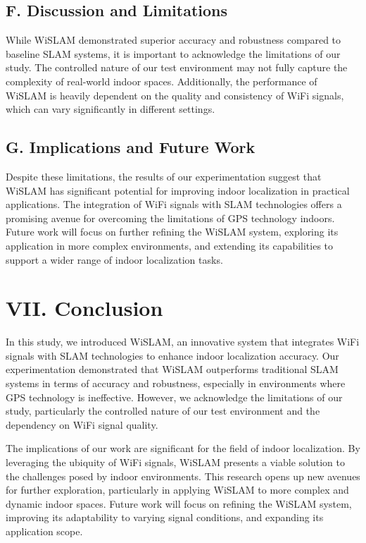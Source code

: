\documentclass[
	a4paper, %
	11pt, %
	unnumberedsections, %
	twoside, %
]{LTJournalArticle}
\begin{document}
\subsection{F.	Discussion and Limitations}
While WiSLAM demonstrated superior accuracy and robustness compared to baseline SLAM systems, it is important to acknowledge the limitations of our study. The controlled nature of our test environment may not fully capture the complexity of real-world indoor spaces. Additionally, the performance of WiSLAM is heavily dependent on the quality and consistency of WiFi signals, which can vary significantly in different settings.

\subsection{G.	Implications and Future Work}
Despite these limitations, the results of our experimentation suggest that WiSLAM has significant potential for improving indoor localization in practical applications. The integration of WiFi signals with SLAM technologies offers a promising avenue for overcoming the limitations of GPS technology indoors. Future work will focus on further refining the WiSLAM system, exploring its application in more complex environments, and extending its capabilities to support a wider range of indoor localization tasks.


\section{VII.	Conclusion}
In this study, we introduced WiSLAM, an innovative system that integrates WiFi signals with SLAM technologies to enhance indoor localization accuracy. Our experimentation demonstrated that WiSLAM outperforms traditional SLAM systems in terms of accuracy and robustness, especially in environments where GPS technology is ineffective. However, we acknowledge the limitations of our study, particularly the controlled nature of our test environment and the dependency on WiFi signal quality.

The implications of our work are significant for the field of indoor localization. By leveraging the ubiquity of WiFi signals, WiSLAM presents a viable solution to the challenges posed by indoor environments. This research opens up new avenues for further exploration, particularly in applying WiSLAM to more complex and dynamic indoor spaces. Future work will focus on refining the WiSLAM system, improving its adaptability to varying signal conditions, and expanding its application scope.
\end{document}
